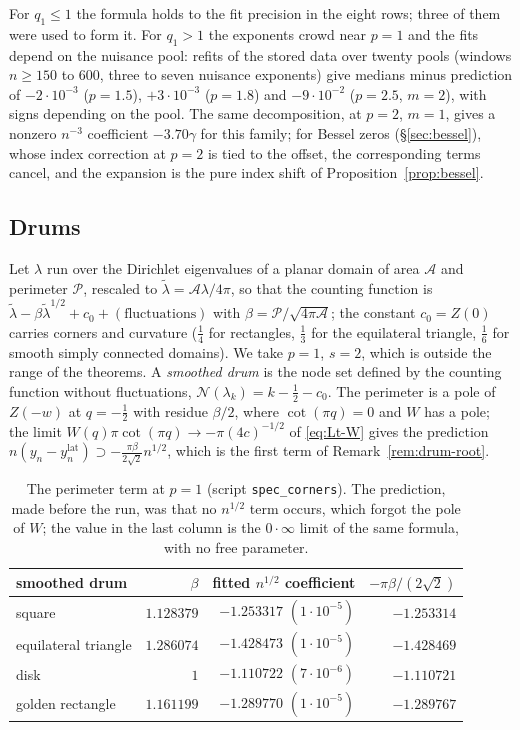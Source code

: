 For $q_1\le1$ the formula holds to the fit precision in the eight rows; three of them were used to form it. For $q_1>1$
the exponents crowd near $p=1$ and the fits depend on the nuisance pool: refits of the stored data over twenty pools
(windows $n\ge150$ to $600$, three to seven nuisance exponents) give medians minus prediction of $-2\cdot10^{-3}$ ($p=1.5$),
$+3\cdot10^{-3}$ ($p=1.8$) and $-9\cdot10^{-2}$ ($p=2.5$, $m=2$), with signs depending on the pool. The same decomposition, at
$p=2$, $m=1$, gives a nonzero $n^{-3}$ coefficient $-3.70\gamma$ for this family; for Bessel zeros (\S\ref{sec:bessel}),
whose index correction at $p=2$ is tied to the offset, the corresponding terms cancel, and the expansion is the pure
index shift of Proposition~\ref{prop:bessel}.

\subsection{Drums}\label{sec:drums}
Let $\lambda$ run over the Dirichlet eigenvalues of a planar domain of area $\mathcal A$ and perimeter $\mathcal P$,
rescaled to $\tilde\lambda=\mathcal A\lambda/4\pi$, so that the counting function is
$\tilde\lambda-\beta\tilde\lambda^{1/2}+c_0+(\text{fluctuations})$ with $\beta=\mathcal P/\sqrt{4\pi\mathcal A}$; the
constant $c_0=Z(0)$ carries corners and curvature ($\frac14$ for rectangles, $\frac13$ for the equilateral triangle,
$\frac16$ for smooth simply connected domains). We take $p=1$, $s=2$, which is outside the range of the theorems. A
\emph{smoothed drum} is the node set defined by the counting function without fluctuations, $\mathcal N(\lambda_k)=k-\frac12-c_0$.
The perimeter is a pole of $Z(-w)$ at $q=-\frac12$ with residue $\beta/2$, where $\cot(\pi q)=0$ and $W$ has a pole; the
limit $W(q)\pi\cot(\pi q)\to-\pi(4c)^{-1/2}$ of \eqref{eq:Lt-W} gives the prediction
$n(y_n-y_n^{\mathrm{lat}})\supset-\frac{\pi\beta}{2\sqrt2}n^{1/2}$, which is the first term of Remark~\ref{rem:drum-root}.

\begin{table}[ht]
\centering
\small
\begin{tabular}{lrrr}
\toprule
smoothed drum & $\beta$ & fitted $n^{1/2}$ coefficient & $-\pi\beta/(2\sqrt2)$\\
\midrule
square & $1.128379$ & $-1.253317$ $(1\cdot10^{-5})$ & $-1.253314$\\
equilateral triangle & $1.286074$ & $-1.428473$ $(1\cdot10^{-5})$ & $-1.428469$\\
disk & $1$ & $-1.110722$ $(7\cdot10^{-6})$ & $-1.110721$\\
golden rectangle & $1.161199$ & $-1.289770$ $(1\cdot10^{-5})$ & $-1.289767$\\
\bottomrule
\end{tabular}
\caption{The perimeter term at $p=1$ (script \texttt{spec\_corners}). The prediction, made before the run, was that no
$n^{1/2}$ term occurs, which forgot the pole of $W$; the value in the last column is the $0\cdot\infty$ limit of the same
formula, with no free parameter.}
\label{tab:drums}
\end{table}

